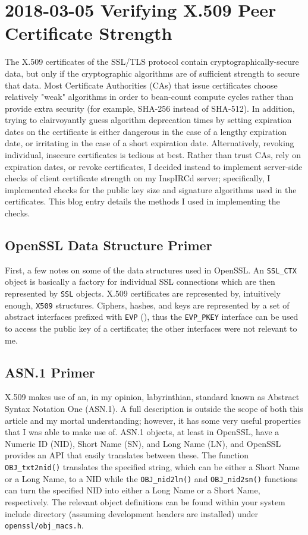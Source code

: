\documentclass{article}
\begin{document}
\section{2018-03-05 Verifying X.509 Peer Certificate Strength}
The X.509 certificates of the SSL/TLS protocol contain cryptographically-secure data, but only if the cryptographic algorithms are of sufficient strength to secure that data.  Most Certificate Authorities (CAs) that issue certificates choose relatively "weak" algorithms in order to bean-count compute cycles rather than provide extra security (for example, SHA-256 instead of SHA-512).  In addition, trying to clairvoyantly guess algorithm deprecation times by setting expiration dates on the certificate is either dangerous in the case of a lengthy expiration date, or irritating in the case of a short expiration date.  Alternatively, revoking individual, insecure certificates is tedious at best.  Rather than trust CAs, rely on expiration dates, or revoke certificates, I decided instead to implement server-side checks of client certificate strength on my InspIRCd server; specifically, I implemented checks for the public key size and signature algorithms used in the certificates.  This blog entry details the  methods I used in implementing the checks.

\subsection{OpenSSL Data Structure Primer}
First, a few notes on some of the data structures used in OpenSSL.  An \texttt{SSL_CTX} object is basically a factory for individual SSL connections which are then represented by \texttt{SSL} objects.  X.509 certificates are represented by, intuitively enough, \texttt{X509} structures.  Ciphers, hashes, and keys are represented by a set of abstract interfaces prefixed with \texttt{EVP} (), thus the \texttt{EVP_PKEY} interface can be used to access the public key of a certificate; the other interfaces were not relevant to me.

\subsection{ASN.1 Primer}
X.509 makes use of an, in my opinion, labyrinthian, standard known as Abstract Syntax Notation One (ASN.1).  A full description is outside the scope of both this article and my mortal understanding; however, it has some very useful properties that I was able to make use of.  ASN.1 objects, at least in OpenSSL, have a Numeric ID (NID), Short Name (SN), and Long Name (LN), and OpenSSL provides an API that easily translates between these.  The function \texttt{OBJ_txt2nid()} translates the specified string, which can be either a Short Name or a Long Name, to a NID while the \texttt{OBJ_nid2ln()} and \texttt{OBJ_nid2sn()} functions can turn the specified NID into either a Long Name or a Short Name, respectively.  The relevant object definitions can be found within your system include directory (assuming development headers are installed) under \texttt{openssl/obj_macs.h}.
\end{document}
